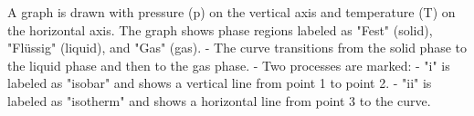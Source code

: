 A graph is drawn with pressure (p) on the vertical axis and temperature (T) on the horizontal axis. The graph shows phase regions labeled as "Fest" (solid), "Flüssig" (liquid), and "Gas" (gas).  
- The curve transitions from the solid phase to the liquid phase and then to the gas phase.  
- Two processes are marked:  
  - "i" is labeled as "isobar" and shows a vertical line from point 1 to point 2.  
  - "ii" is labeled as "isotherm" and shows a horizontal line from point 3 to the curve.